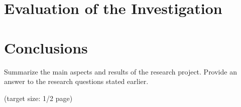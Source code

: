 \documentclass[a4paper,11pt,oneside]{article}
\begin{document}
  \section{Evaluation of the Investigation}
  \label{sec:4}




\section{Conclusions}
\label{sec:5}

  Summarize the main aspects and results of the research
  project. Provide an answer to the research questions stated earlier.

  (target size: 1/2 page)
  
  \newpage
  
  \printbibliography
  
\end{document}
